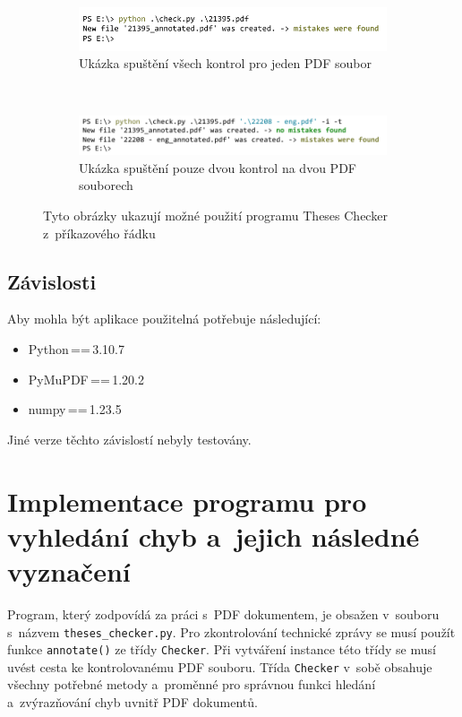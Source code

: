 \begin{figure}[H]
    \centering
    \begin{subfigure}[b]{0.8\linewidth}
        \includegraphics[width=\linewidth]{obrazky-figures/cmd_screenshot_one.pdf}
        \caption{Ukázka spuštění všech kontrol pro jeden PDF soubor}
        \label{pic_theses_checker_cmd_one}
    \end{subfigure}

    \hfill\\
    \begin{subfigure}[b]{0.85\linewidth}
        \includegraphics[width=\linewidth]{obrazky-figures/cmd_screenshot_many.pdf}
        \caption{Ukázka spuštění pouze dvou kontrol na dvou PDF souborech}
        \label{pic_theses_checker_cmd_many}
    \end{subfigure}
    \caption{
        Tyto obrázky ukazují možné použití programu Theses Checker
        z~příkazového řádku
    }
    \label{pic_theses_checker_cmd}
\end{figure}



\subsection*{Závislosti}
Aby mohla být aplikace použitelná potřebuje následující:
\begin{itemize}
    \item Python\,==\,3.10.7
    \item PyMuPDF\,==\,1.20.2
    \item numpy\,==\,1.23.5
\end{itemize}
Jiné verze těchto závislostí nebyly testovány.



\section{Implementace programu pro vyhledání chyb a~jejich následné vyznačení} \label{checker}
Program, který zodpovídá za práci s~PDF dokumentem, je obsažen v~souboru s~názvem
\texttt{theses\_checker.py}. Pro zkontrolování technické zprávy se musí použít
funkce \texttt{annotate()} ze třídy \texttt{Checker}. Při vytváření instance této
třídy se musí uvést cesta ke kontrolovanému PDF souboru. Třída \texttt{Checker}
v~sobě obsahuje všechny potřebné metody a~proměnné pro správnou funkci hledání
a~zvýrazňování chyb uvnitř PDF dokumentů.

